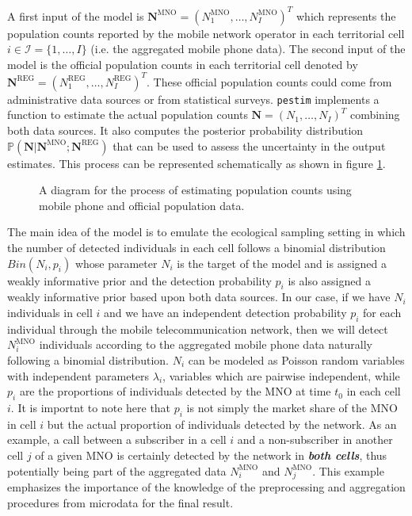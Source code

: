 \documentclass[12pt, a4paper]{article}
\begin{document}
A first input of the model is 
$\mathbf{N}^{\textrm{MNO}}=(N_{1}^{\textrm{MNO}}, \dots, N_{I}^{\textrm{MNO}})^{T}$ which 
represents the population counts reported by the mobile network operator in 
each territorial cell $i\in\mathcal{I}=\{1,\dots,I\}$ (i.e. the aggregated mobile phone data). 
The second input of the model is the official population counts in each territorial cell denoted by 
$\mathbf{N}^{\textrm{REG}}=(N_{1}^{\textrm{REG}}, \dots, N_{I}^{\textrm{REG}})^{T}$. 
These official population counts could come from administrative data sources or from statistical surveys.
\texttt{pestim} implements a function to estimate the actual population 
counts $\mathbf{N}=(N_{1}, \dots, N_{I})^{T}$ combining both data sources. 
It also computes the posterior probability distribution 
$\mathbb{P}\left(\mathbf{N}|\mathbf{N}^{\textrm{MNO}};\mathbf{N}^{\textrm{REG}}\right)$ 
that can be used to assess the uncertainty in the output estimates.
This process can be represented schematically as shown in figure \ref{Tool}.

\begin{figure}
%
\caption{A diagram for the process of estimating population counts using mobile phone and official population data.}
\label{Tool}
\end{figure}


The main idea of the model is to emulate the ecological sampling setting in which 
the number of detected individuals in each cell follows a binomial distribution $Bin(N_{i}, p_{i})$ 
whose parameter $N_{i}$ is the target of the model and is assigned a weakly informative prior 
and the detection probability $p_{i}$ is also assigned a weakly informative prior based 
upon both data sources. In our case, if we have $N_{i}$ individuals in cell $i$ and 
we have an independent detection probability $p_{i}$ for each individual through 
the mobile telecommunication network, then we will detect $N_{i}^{\textrm{MNO}}$ 
individuals according to the aggregated mobile phone data naturally following a binomial 
distribution. $N_{i}$  can be modeled as Poisson random variables with independent 
parameters $\lambda_{i}$, variables which are pairwise independent, while $p_{i}$ are 
the proportions of individuals detected by the MNO at time $t_{0}$ in each cell $i$. 
It is importnt to note here that $p_{i}$ is not simply the market share of the MNO in 
cell $i$ but the actual proportion of individuals detected by the network. As an 
example, a call between a subscriber in a cell $i$ and a non-subscriber in another 
cell $j$ of a given MNO is certainly detected by the network in \emph{\textbf{both cells}}, 
thus potentially being part of the aggregated data $N_{i}^{\textrm{MNO}}$ and $N_{j}^{\textrm{MNO}}$. 
This example emphasizes the importance  of the knowledge of the preprocessing and aggregation 
procedures from microdata for the final result.
\end{document}
